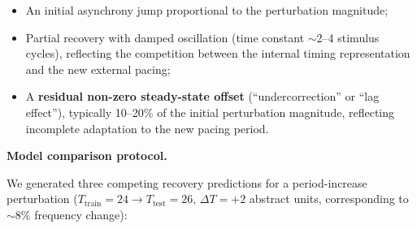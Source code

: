 \documentclass[12pt,a4paper]{article}
\begin{document}
\begin{itemize}

    \item An initial asynchrony jump proportional to the perturbation magnitude;

    \item Partial recovery with damped oscillation (time constant $\sim$2--4 stimulus cycles), reflecting the competition between the internal timing representation and the new external pacing;

    \item A \textbf{residual non-zero steady-state offset} (``undercorrection'' or ``lag effect''), typically 10--20\% of the initial perturbation magnitude, reflecting incomplete adaptation to the new pacing period.

\end{itemize}



\textbf{Model comparison protocol.}

We generated three competing recovery predictions for a period-increase perturbation ($T_{\text{train}} = 24 \rightarrow T_{\text{test}} = 26$, $\Delta T = +2$ abstract units, corresponding to $\sim$8\% frequency change):
\end{document}
